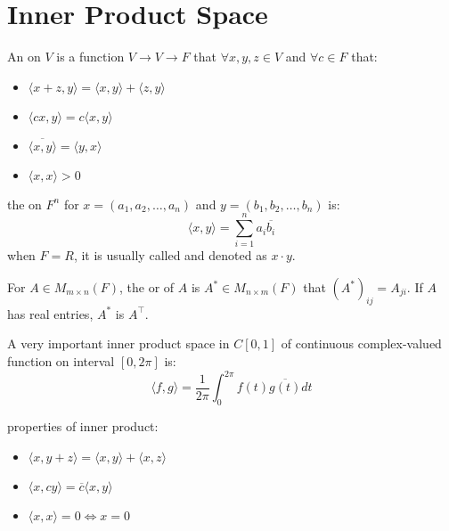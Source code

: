 \section{Inner Product Space}

\begin{definition}
	An  on $V$ is a function $V \rightarrow V \rightarrow F$ that $\forall x,y,z \in V$ and $\forall c \in F$ that:
	\begin{itemize}
		\item $\langle x+z,y \rangle = \langle x,y \rangle + \langle z,y \rangle$
		\item $\langle cx,y \rangle = c \langle  x,y \rangle$
		\item $\overline{\langle x,y \rangle} = \langle y,x \rangle$
		\item $\langle x,x \rangle > 0$
	\end{itemize}
\end{definition}

\begin{definition}
	the  on $F^n$ for $x=(a_1,a_2,\dots,a_n)$ and $y=(b_1,b_2,\dots,b_n)$ is:
	\begin{equation}
		\langle x,y \rangle = \sum_{i=1}^n a_i \overline{b_i}		
	\end{equation}
	when $F=R$, it is usually called  and denoted as $x \cdot y$.
\end{definition}

\begin{definition}
	For $A \in M_{m \times n}(F)$, the  or  of $A$ is $A^* \in M_{n \times m}(F)$ that $(A^*)_{ij} = A_{ji}$. If $A$ has real entries, $A^*$ is $A^\top$.
\end{definition}

\begin{definition}
	A very important inner product space in $C[0,1]$ of continuous complex-valued function on interval $[0, 2\pi]$ is:
	\begin{equation}
		\langle f,g \rangle = \frac{1}{2\pi} \int_{0}^{2\pi} f(t) \overline{g(t)} dt
	\end{equation}
\end{definition}

\begin{theorem}
	properties of inner product:
	\begin{itemize}
		\item $\langle x, y+z \rangle = \langle x,y \rangle + \langle x,z \rangle$
		\item $\langle x, cy \rangle = \overline{c} \langle x , y \rangle $
		\item $\langle x,x \rangle = 0 \iff x = 0$
	\end{itemize}
\end{theorem}

